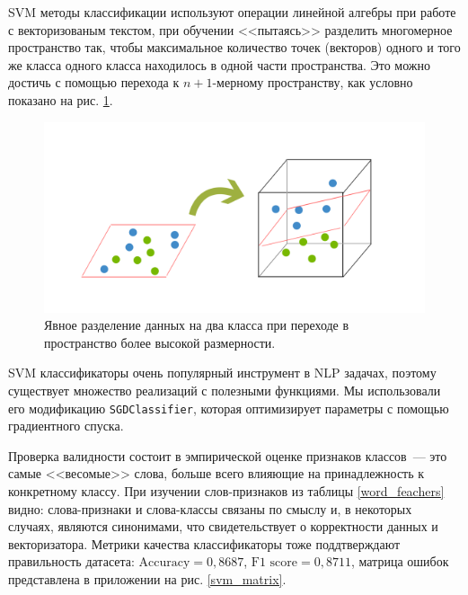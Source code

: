 \documentclass[a4paper, 14pt]{extarticle}
\begin{document}
SVM методы классификации используют операции линейной алгебры при работе с векторизованым текстом, при обучении <<пытаясь>> разделить многомерное пространство так, чтобы максимальное количество точек  (векторов) одного и того же класса одного класса находилось в одной части пространства. Это можно достичь с помощью перехода к $n+1$-мерному пространству, как условно показано на рис. \ref{svm_cond}.

\begin{figure}
	\centering
	\includegraphics[scale=0.6]{svm_cond}
	\caption{Явное разделение данных на два класса при переходе в пространство более высокой размерности.}
	\label{svm_cond}
\end{figure}

SVM классификаторы очень популярный инструмент в NLP задачах, поэтому существует множество реализаций с полезными функциями. Мы использовали его модификацию \verb+SGDClassifier+, которая оптимизирует параметры с помощью градиентного спуска.

Проверка валидности состоит в эмпирической оценке признаков классов~--- это самые <<весомые>> слова, больше всего влияющие на принадлежность к конкретному классу. При изучении слов-признаков из таблицы \ref{word_feachers} видно: слова-признаки и слова-классы связаны по смыслу и, в некоторых случаях, являются синонимами, что свидетельствует о корректности данных и векторизатора. Метрики качества классификаторы тоже поддтверждают правильность датасета: $\text{Accuracy} = 0,8687$, $\text{F1 score} = 0,8711$, матрица ошибок представлена в приложении на рис. \ref{svm_matrix}.
\end{document}
